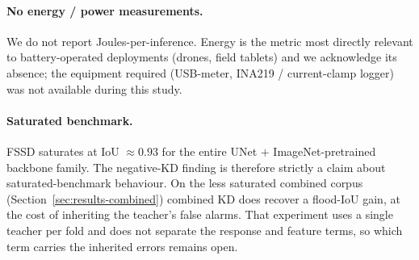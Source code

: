 \paragraph{No energy / power measurements.} We do not report Joules-per-inference. Energy is the metric most directly relevant to battery-operated deployments (drones, field tablets) and we acknowledge its absence; the equipment required (USB-meter, INA219 / current-clamp logger) was not available during this study.

\paragraph{Saturated benchmark.} FSSD saturates at IoU $\approx 0.93$ for the entire UNet $+$ ImageNet-pretrained backbone family. The negative-KD finding is therefore strictly a claim about saturated-benchmark behaviour. On the less saturated combined corpus (Section~\ref{sec:results-combined}) combined KD does recover a flood-IoU gain, at the cost of inheriting the teacher's false alarms. That experiment uses a single teacher per fold and does not separate the response and feature terms, so which term carries the inherited errors remains open.
